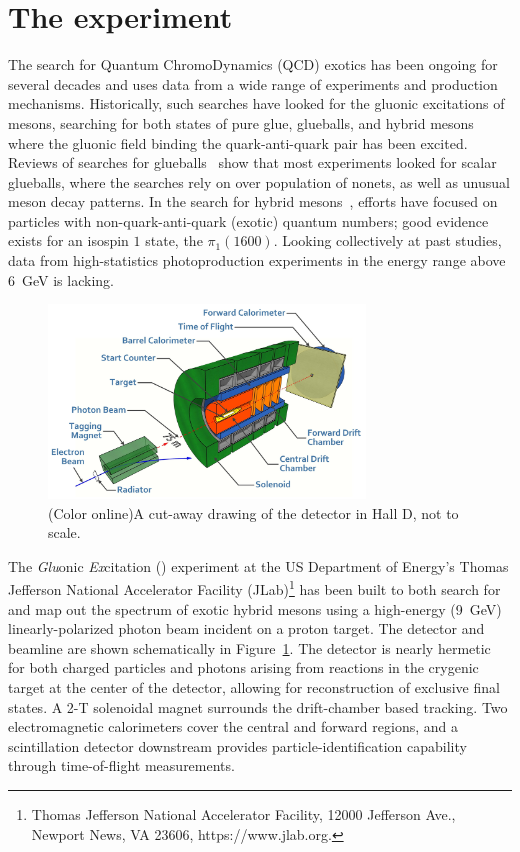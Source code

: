 \section[The \gx{} experiment]{\label{sec:gluexexperiment} The \gx{} experiment}
The search for Quantum ChromoDynamics (QCD) exotics has been ongoing for several decades and uses data from a wide range of experiments and production mechanisms. Historically, such searches have looked for the gluonic excitations of mesons, searching for both states of pure glue, glueballs, and hybrid mesons where the gluonic field binding the quark-anti-quark pair has been excited. Reviews of searches for glueballs~\cite{Crede:2008vw} show that most experiments looked for scalar glueballs, where the searches rely on over population of nonets, as well as unusual meson decay patterns. In the search for hybrid mesons~\cite{Meyer:2010ku,Meyer:2015eta}, efforts have focused on particles with non-quark-anti-quark (exotic) quantum numbers; good evidence exists for an isospin $1$ state, the $\pi_{1}(1600)$. Looking collectively at past studies, data from high-statistics photoproduction experiments in the energy range above $6$~GeV is lacking. 

\begin{figure}[h!]\centering
\includegraphics[width=0.75\textwidth]{figures/GlueX-graphic.jpg}
\caption[]{\label{fig:gluex_cut-away}(Color online)A cut-away drawing of the \GX{} detector in Hall D, not to scale.}
\end{figure}
The \emph{Glu}onic \emph{Ex}citation (\gx{}) experiment at the 
US Department of Energy's Thomas Jefferson National Accelerator Facility (JLab)\footnote{Thomas Jefferson National Accelerator Facility, 12000 Jefferson Ave., Newport News, VA 23606, https://www.jlab.org.} has been built to both search for and map out the spectrum of exotic hybrid mesons using a high-energy (9~GeV) linearly-polarized photon beam incident on a proton target\cite{gluex-ref}. The \gx{} detector and beamline are shown schematically in Figure~\ref{fig:gluex_cut-away}. The detector is nearly hermetic for both charged particles and photons arising from reactions in the crygenic target at the center of the detector, allowing for reconstruction of exclusive final states. A 2-T solenoidal magnet surrounds the drift-chamber based tracking. Two electromagnetic calorimeters cover the central and forward regions, and a scintillation detector downstream provides particle-identification capability through time-of-flight measurements. 


